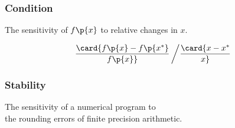 \begin{frame}

\frametitle{Condition}

\begin{center}

The sensitivity of $f\p{x}$ to relative changes in $x$.

$$\card{f\p{x} - f\p{x^*} \over f\p{x}} \left/ \card{ x - x^* \over x} \right. $$

\end{center}



\end{frame}


\begin{frame}

\frametitle{Stability}

\begin{center}

The sensitivity of a numerical program to \\ the rounding errors of finite
precision arithmetic.

\end{center}

\end{frame}
